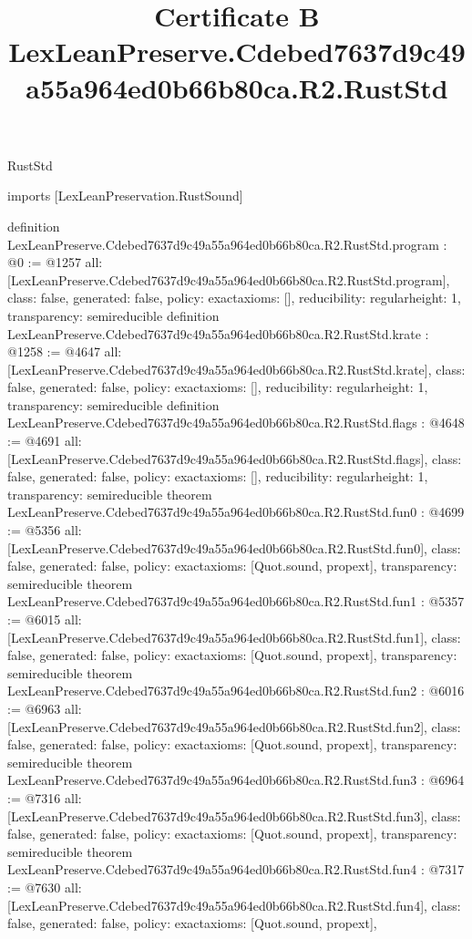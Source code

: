 \begin{lexlean}{RustStd}
\title{Certificate B LexLeanPreserve.Cdebed7637d9c49a55a964ed0b66b80ca.R2.RustStd}
\begin{coremodule}
imports [LexLeanPreservation.RustSound]

definition LexLeanPreserve.Cdebed7637d9c49a55a964ed0b66b80ca.R2.RustStd.program : @0 := @1257 {
  all: [LexLeanPreserve.Cdebed7637d9c49a55a964ed0b66b80ca.R2.RustStd.program],
  class: false,
  generated: false,
  policy: exact{axioms: []},
  reducibility: regular{height: 1},
  transparency: semireducible
}
definition LexLeanPreserve.Cdebed7637d9c49a55a964ed0b66b80ca.R2.RustStd.krate : @1258 := @4647 {
  all: [LexLeanPreserve.Cdebed7637d9c49a55a964ed0b66b80ca.R2.RustStd.krate],
  class: false,
  generated: false,
  policy: exact{axioms: []},
  reducibility: regular{height: 1},
  transparency: semireducible
}
definition LexLeanPreserve.Cdebed7637d9c49a55a964ed0b66b80ca.R2.RustStd.flags : @4648 := @4691 {
  all: [LexLeanPreserve.Cdebed7637d9c49a55a964ed0b66b80ca.R2.RustStd.flags],
  class: false,
  generated: false,
  policy: exact{axioms: []},
  reducibility: regular{height: 1},
  transparency: semireducible
}
theorem LexLeanPreserve.Cdebed7637d9c49a55a964ed0b66b80ca.R2.RustStd.fun0 : @4699 := @5356 {
  all: [LexLeanPreserve.Cdebed7637d9c49a55a964ed0b66b80ca.R2.RustStd.fun0],
  class: false,
  generated: false,
  policy: exact{axioms: [Quot.sound, propext]},
  transparency: semireducible
}
theorem LexLeanPreserve.Cdebed7637d9c49a55a964ed0b66b80ca.R2.RustStd.fun1 : @5357 := @6015 {
  all: [LexLeanPreserve.Cdebed7637d9c49a55a964ed0b66b80ca.R2.RustStd.fun1],
  class: false,
  generated: false,
  policy: exact{axioms: [Quot.sound, propext]},
  transparency: semireducible
}
theorem LexLeanPreserve.Cdebed7637d9c49a55a964ed0b66b80ca.R2.RustStd.fun2 : @6016 := @6963 {
  all: [LexLeanPreserve.Cdebed7637d9c49a55a964ed0b66b80ca.R2.RustStd.fun2],
  class: false,
  generated: false,
  policy: exact{axioms: [Quot.sound, propext]},
  transparency: semireducible
}
theorem LexLeanPreserve.Cdebed7637d9c49a55a964ed0b66b80ca.R2.RustStd.fun3 : @6964 := @7316 {
  all: [LexLeanPreserve.Cdebed7637d9c49a55a964ed0b66b80ca.R2.RustStd.fun3],
  class: false,
  generated: false,
  policy: exact{axioms: [Quot.sound, propext]},
  transparency: semireducible
}
theorem LexLeanPreserve.Cdebed7637d9c49a55a964ed0b66b80ca.R2.RustStd.fun4 : @7317 := @7630 {
  all: [LexLeanPreserve.Cdebed7637d9c49a55a964ed0b66b80ca.R2.RustStd.fun4],
  class: false,
  generated: false,
  policy: exact{axioms: [Quot.sound, propext]},
}
\end{coremodule}
\end{lexlean}
